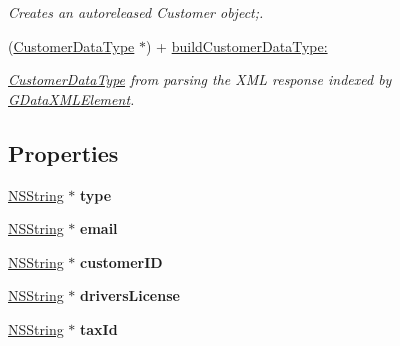 \begin{DoxyCompactItemize}
\begin{DoxyCompactList}\small\item\em Creates an autoreleased Customer object;. \item\end{DoxyCompactList}\item 
(\hyperlink{interface_customer_data_type}{CustomerDataType} $\ast$) + \hyperlink{interface_customer_data_type_a211da3a7a3ca1a622fe3505eba7834d4}{buildCustomerDataType:}
\begin{DoxyCompactList}\small\item\em \hyperlink{interface_customer_data_type}{CustomerDataType} from parsing the XML response indexed by \hyperlink{interface_g_data_x_m_l_element}{GDataXMLElement}. \item\end{DoxyCompactList}\end{DoxyCompactItemize}
\subsection*{Properties}
\begin{DoxyCompactItemize}
\item 
\hypertarget{interface_customer_data_type_a4c5ee67bfaa3ddbf620c5e23f13f7840}{
\hyperlink{class_n_s_string}{NSString} $\ast$ {\bfseries type}}
\label{interface_customer_data_type_a4c5ee67bfaa3ddbf620c5e23f13f7840}

\item 
\hypertarget{interface_customer_data_type_a0fc2426033e07c5c34bdc65f24f40d47}{
\hyperlink{class_n_s_string}{NSString} $\ast$ {\bfseries email}}
\label{interface_customer_data_type_a0fc2426033e07c5c34bdc65f24f40d47}

\item 
\hypertarget{interface_customer_data_type_a6c6da7b823ca94fdd93230fc2be81139}{
\hyperlink{class_n_s_string}{NSString} $\ast$ {\bfseries customerID}}
\label{interface_customer_data_type_a6c6da7b823ca94fdd93230fc2be81139}

\item 
\hypertarget{interface_customer_data_type_aeb84cb742ee66c394bbc7b14f9fb0259}{
\hyperlink{class_n_s_string}{NSString} $\ast$ {\bfseries driversLicense}}
\label{interface_customer_data_type_aeb84cb742ee66c394bbc7b14f9fb0259}

\item 
\hypertarget{interface_customer_data_type_aae0a9e538e47cca26bf1e5023fb530a3}{
\hyperlink{class_n_s_string}{NSString} $\ast$ {\bfseries taxId}}
\label{interface_customer_data_type_aae0a9e538e47cca26bf1e5023fb530a3}

\end{DoxyCompactItemize}



